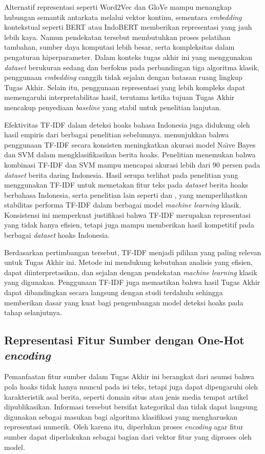 Alternatif representasi seperti Word2Vec dan GloVe mampu menangkap hubungan semantik antarkata melalui vektor kontinu, sementara \textit{embedding} kontekstual seperti BERT atau IndoBERT memberikan representasi yang jauh lebih kaya. Namun pendekatan tersebut membutuhkan proses pelatihan tambahan, sumber daya komputasi lebih besar, serta kompleksitas dalam pengaturan hiperparameter. Dalam konteks tugas akhir ini yang menggunakan \textit{dataset} berukuran sedang dan berfokus pada perbandingan tiga algoritma klasik, penggunaan \textit{embedding} canggih tidak sejalan dengan batasan ruang lingkup Tugas Akhir. Selain itu, penggunaan representasi yang lebih kompleks dapat memengaruhi interpretabilitas hasil, terutama ketika tujuan Tugas Akhir mencakup penyediaan \textit{baseline} yang stabil untuk penelitian lanjutan.

Efektivitas TF-IDF dalam deteksi hoaks bahasa Indonesia juga didukung oleh hasil empiris dari berbagai penelitian sebelumnya. \textcite{prasetyo2019evaluation} menunjukkan bahwa penggunaan TF-IDF secara konsisten meningkatkan akurasi model Na\"{\i}ve Bayes dan SVM dalam mengklasifikasikan berita hoaks. Penelitian \textcite{sihombing2020article} menemukan bahwa kombinasi TF-IDF dan SVM mampu mencapai akurasi lebih dari 90 persen pada \textit{dataset} berita daring Indonesia. Hasil serupa terlihat pada penelitian \textcite{pratiwi2022hoax} yang menggunakan TF-IDF untuk memetakan fitur teks pada \textit{dataset} berita hoaks berbahasa Indonesia, serta penelitian lain seperti \textcite{prasetijo2017hoax} dan \textcite{triyono2023indonesian}, yang memperlihatkan stabilitas performa TF-IDF dalam berbagai model \textit{machine learning} klasik. Konsistensi ini memperkuat justifikasi bahwa TF-IDF merupakan representasi yang tidak hanya efisien, tetapi juga mampu memberikan hasil kompetitif pada berbagai \textit{dataset} hoaks Indonesia.

Berdasarkan pertimbangan tersebut, TF-IDF menjadi pilihan yang paling relevan untuk Tugas Akhir ini. Metode ini mendukung kebutuhan analisis yang efisien, dapat diinterpretasikan, dan sejalan dengan pendekatan \textit{machine learning} klasik yang digunakan. Penggunaan TF-IDF juga memastikan bahwa hasil Tugas Akhir dapat dibandingkan secara langsung dengan studi terdahulu sehingga memberikan dasar yang kuat bagi pengembangan model deteksi hoaks pada tahap selanjutnya.

\subsection{Representasi Fitur Sumber dengan One-Hot \textit{encoding}}
Pemanfaatan fitur sumber dalam Tugas Akhir ini berangkat dari asumsi bahwa pola hoaks tidak hanya muncul pada isi teks, tetapi juga dapat dipengaruhi oleh karakteristik asal berita, seperti domain situs atau jenis media tempat artikel dipublikasikan. Informasi tersebut bersifat kategorikal dan tidak dapat langsung digunakan sebagai masukan bagi algoritma klasifikasi yang mengharuskan representasi numerik. Oleh karena itu, diperlukan proses \textit{encoding} agar fitur sumber dapat diperlakukan sebagai bagian dari vektor fitur yang diproses oleh model.

